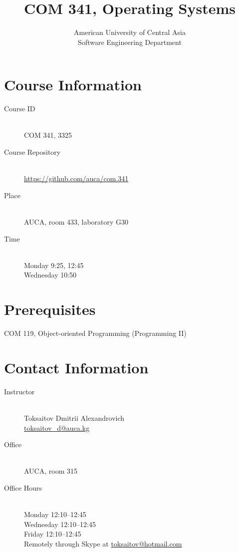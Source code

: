 \documentclass[12pt,a4paper,oneside]{article}
\begin{document}
    \title{COM 341, Operating Systems}
    \author{
        American University of Central Asia\\
        Software Engineering Department
    }
    \date{}
    \maketitle

    \section{Course Information}

        \begin{description}
            \item[Course ID]\hfill\\
                COM 341, 3325
            \item[Course Repository]\hfill\\
                \url{https://github.com/auca/com.341}
            \item[Place]\hfill\\
                AUCA, room 433, laboratory G30
            \item[Time]\hfill\\
                Monday 9:25, 12:45\\
                Wednesday 10:50
        \end{description}

    \section{Prerequisites}

        COM 119, Object-oriented Programming (Programming II)

    \section{Contact Information}

        \begin{description}
            \item[Instructor]\hfill\\
                Toksaitov Dmitrii Alexandrovich\\
                \href{mailto:toksaitov_d@auca.kg}{toksaitov\_d@auca.kg}
            \item[Office]\hfill\\
                AUCA, room 315
            \item[Office Hours]\hfill\\
                Monday 12:10--12:45\\
                Wednesday 12:10--12:45\\
                Friday 12:10--12:45\\
                Remotely through Skype at \href{mailto:toksaitov_d@auca.kg}{toksaitov@hotmail.com}
        \end{description}
\end{document}
